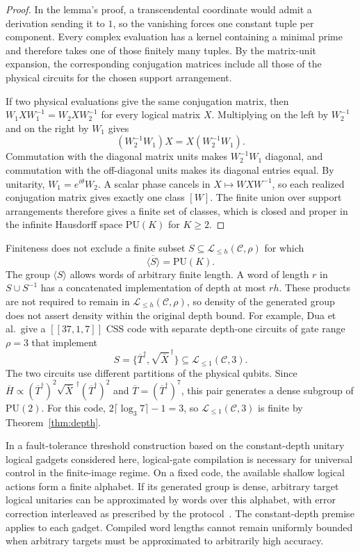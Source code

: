 \documentclass[aps,prl,reprint,notitlepage,nofootinbib,nobibnotes]{revtex4-2}
\newcommand{\PU}{\mathrm{PU}}
\begin{document}
\begin{proof}
In the lemma's proof, a transcendental coordinate would admit a
derivation sending it to \(1\), so the vanishing forces one
constant tuple per component. Every complex evaluation has a kernel
containing a minimal prime and therefore takes one of those finitely
many tuples. By the matrix-unit expansion, the corresponding
conjugation matrices include all those of the physical circuits
for the chosen support arrangement.

If two physical evaluations give the same conjugation matrix, then
\(W_1XW_1^{-1}=W_2XW_2^{-1}\) for every logical matrix \(X\).
Multiplying on the left by \(W_2^{-1}\) and on the right by \(W_1\)
gives
\[
  (W_2^{-1}W_1)X=X(W_2^{-1}W_1).
\]
Commutation with the diagonal matrix units makes \(W_2^{-1}W_1\)
diagonal, and commutation with the off-diagonal units makes its
diagonal entries equal. By unitarity, \(W_1=e^{i\theta}W_2\). A scalar phase cancels
in \(X\mapsto WXW^{-1}\), so each realized conjugation matrix gives
exactly one class \([W]\). The finite union over support arrangements
therefore gives a finite set of classes, which is closed and proper
in the infinite Hausdorff space \(\PU(K)\) for \(K\ge2\).
\end{proof}


Finiteness does not exclude a finite subset \(S\subseteq\mathcal L_{\le h}(\mathcal C,\rho)\)
for which
\[
 \overline{\langle S\rangle}=\PU(K).
\]
The group \(\langle S\rangle\) allows words of arbitrary finite length.
A word of length \(r\) in \(S\cup S^{-1}\) has a concatenated
implementation of depth at most \(rh\). These products are not required
to remain in \(\mathcal L_{\le h}(\mathcal C,\rho)\), so density of the generated group does not
assert density within the original depth bound.
For example, Dua et al.\ give a \([[37,1,7]]\) CSS code with separate depth-one
circuits of gate range \(\rho=3\) that
implement~\cite[Sec.~V and Appendix~B~3]{Dua}
\[
 S=\bigl\{\overline T^\dagger,
          \sqrt{\overline X}^{\,\dagger}\bigr\}
   \subseteq\mathcal L_{\le1}(\mathcal C,3).
\]
The two circuits use different partitions of the physical qubits.
Since \(\overline H\propto
(\overline T^\dagger)^2\sqrt{\overline X}^{\,\dagger}
(\overline T^\dagger)^2\) and
\(\overline T=(\overline T^\dagger)^7\), this pair generates a dense
subgroup of \(\PU(2)\). For this code,
\(2\lceil\log_3 7\rceil-1=3\), so \(\mathcal L_{\le1}(\mathcal C,3)\) is finite by
Theorem~\ref{thm:depth}.


In a fault-tolerance threshold construction based on the constant-depth
unitary logical gadgets considered here, logical-gate compilation is
necessary for universal control in the finite-image regime. On a fixed
code, the available shallow logical actions form a finite alphabet. If
its generated group is dense, arbitrary target logical unitaries can be
approximated by words over this alphabet, with error correction
interleaved as prescribed by the protocol~\cite{Gottesman,Dua}. The
constant-depth premise applies to each gadget. Compiled word lengths cannot
remain uniformly bounded when arbitrary targets must be approximated to
arbitrarily high accuracy.
\end{document}
